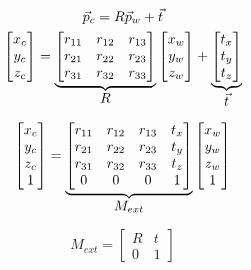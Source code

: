 \begin{gather}
    \vec{p}_c = R\vec{p}_w + \vec{t} \\
    \begin{bmatrix}
        x_c \\ y_c \\ z_c
    \end{bmatrix}
    =
    \underbrace{
        \begin{bmatrix}
            r_{11} & r_{12} & r_{13} \\
            r_{21} & r_{22} & r_{23} \\
            r_{31} & r_{32} & r_{33}
        \end{bmatrix}
    }_{\mathlarger{R}}
    \begin{bmatrix}
        x_w \\ y_w \\ z_w
    \end{bmatrix}
    +
    \underbrace{  
        \begin{bmatrix}
            t_x \\ t_y \\ t_z
        \end{bmatrix}
    }_{\mathlarger{\vec{t}}}
\end{gather}


\begin{equation}
    \begin{bmatrix}
        x_c \\ y_c \\ z_c \\ 1
    \end{bmatrix}
    =
    \underbrace{
        \begin{bmatrix}
            r_{11} & r_{12} & r_{13} & t_x \\
            r_{21} & r_{22} & r_{23} & t_y \\
            r_{31} & r_{32} & r_{33} & t_z \\
            0      & 0      & 0      & 1
        \end{bmatrix}
    }_{\mathlarger{M_{ext}}}
    \begin{bmatrix}
        x_w \\ y_w \\ z_w \\1
    \end{bmatrix}
\end{equation}

\begin{equation}
    M_{ext} = 
    \begin{bmatrix}
        R & t  \\
        0 & 1
    \end{bmatrix} 
\end{equation}

